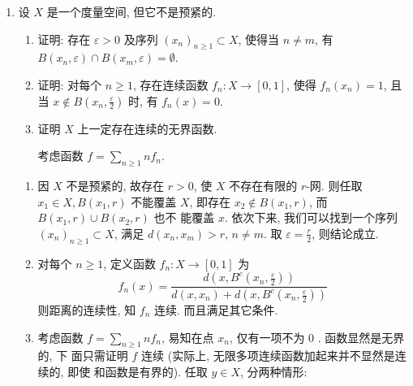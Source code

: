 \begin{enumerate}
\begin{answer}
\begin{enumerate}
            \end{enumerate}
        \end{answer}
    \item 设 $X$ 是一个度量空间, 但它不是预紧的.
        \begin{enumerate}
            \item 证明: 存在 $\varepsilon>0$ 及序列 $\left(x_{n}\right)_{n \geq 1} \subset X$, 使得当 $n \neq  m$, 有 $B\left(x_{n}, \varepsilon\right) \cap B\left(x_{m}, \varepsilon\right)=\emptyset$.
            \item 证明: 对每个 $n \geq 1$, 存在连续函数 $f_{n}: X \rightarrow[0,1]$, 使得 $f_{n}\left(x_{n}\right)=1$, 且当 $x \notin B\left(x_{n}, \frac{\varepsilon}{2}\right)$ 时, 有 $f_{n}(x)=0$.
            \item 证明 $X$ 上一定存在连续的无界函数. 
                \begin{hint}
                    考虑函数 $f=\sum_{n \geq 1} n f_{n}$.
                \end{hint}
        \end{enumerate}
        \begin{answer}
            \begin{enumerate}
                \item 
                因 $X$ 不是预紧的, 故存在 $r>0$, 使 $X$ 不存在有限的 $r$-网. 则任取 $x_{1} \in X, B\left(x_{1}, r\right)$ 不能覆盖 $X$, 即存在 $x_{2} \notin B\left(x_{1}, r\right)$, 而 $B\left(x_{1}, r\right) \cup B\left(x_{2}, r\right)$ 也不 能覆盖 $x$. 依次下来, 我们可以找到一个序列 $\left(x_{n}\right)_{n \geq 1} \subset X$, 满足 $d\left(x_{n}, x_{m}\right)>r$, $n \neq  m$. 取 $\varepsilon=\frac{r}{2}$, 则结论成立.
                \item 对每个 $n \geq 1$, 定义函数 $f_{n}: X \rightarrow[0,1]$ 为
                \[
                f_{n}(x)=\frac{d\left(x, B^{c}\left(x_{n}, \frac{\varepsilon}{2}\right)\right)}{d\left(x, x_{n}\right)+d\left(x, B^{c}\left(x_{n}, \frac{\varepsilon}{2}\right)\right)}
                \]
                则距离的连续性, 知 $f_{n}$ 连续. 而且满足其它条件.
                \item 考虑函数 $f=\sum_{n \geq 1} n f_{n}$, 易知在点 $x_{n}$, 仅有一项不为 0 . 函数显然是无界的, 下 面只需证明 $f$ 连续 (实际上, 无限多项连续函数加起来并不显然是连续的, 即使 和函数是有界的).
                任取 $y \in X$, 分两种情形: 
\end{enumerate}
\end{answer}
\end{enumerate}
